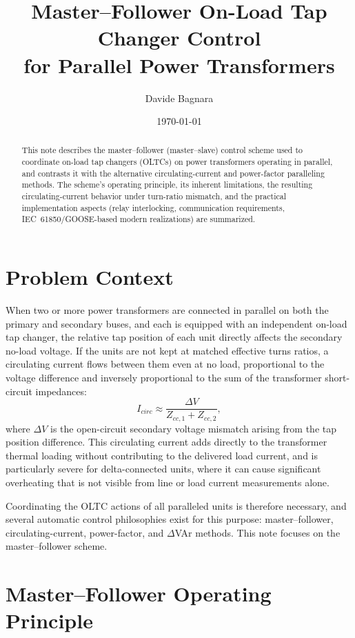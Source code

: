 \documentclass[11pt,a4paper]{article}
\title{Master--Follower On-Load Tap Changer Control\\ for Parallel Power Transformers}
\author{Davide Bagnara}
\date{\today}
\begin{document}
\maketitle

\begin{abstract}
This note describes the master--follower (master--slave) control scheme used to coordinate on-load tap changers (OLTCs) on power transformers operating in parallel, and contrasts it with the alternative circulating-current and power-factor paralleling methods. The scheme's operating principle, its inherent limitations, the resulting circulating-current behavior under turn-ratio mismatch, and the practical implementation aspects (relay interlocking, communication requirements, IEC~61850/GOOSE-based modern realizations) are summarized.
\end{abstract}

\section{Problem Context}

When two or more power transformers are connected in parallel on both the primary and secondary buses, and each is equipped with an independent on-load tap changer, the relative tap position of each unit directly affects the secondary no-load voltage. If the units are not kept at matched effective turns ratios, a circulating current flows between them even at no load, proportional to the voltage difference and inversely proportional to the sum of the transformer short-circuit impedances:
\begin{equation}
I_{circ} \approx \frac{\Delta V}{Z_{cc,1}+Z_{cc,2}},
\end{equation}
where $\Delta V$ is the open-circuit secondary voltage mismatch arising from the tap position difference. This circulating current adds directly to the transformer thermal loading without contributing to the delivered load current, and is particularly severe for delta-connected units, where it can cause significant overheating that is not visible from line or load current measurements alone.

Coordinating the OLTC actions of all paralleled units is therefore necessary, and several automatic control philosophies exist for this purpose: master--follower, circulating-current, power-factor, and $\Delta$VAr methods. This note focuses on the master--follower scheme.

\section{Master--Follower Operating Principle}
\end{document}
